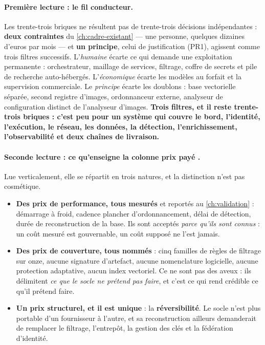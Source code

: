 \paragraph{Première lecture : le fil conducteur.} Les trente-trois briques ne résultent pas de
trente-trois décisions indépendantes : \textbf{deux contraintes} du \cref{ch:cadre-existant} ---
une personne, quelques dizaines d'euros par mois --- et \textbf{un principe}, celui de
justification (PR1), agissent comme trois filtres successifs. L'\emph{humaine} écarte ce qui
demande une exploitation permanente : orchestrateur, maillage de services, filtrage, coffre de
secrets et pile de recherche auto-hébergés. L'\emph{économique} écarte les modèles au forfait et
la supervision commerciale. Le \emph{principe} écarte les doublons : base vectorielle séparée,
second registre d'images, ordonnanceur externe, analyseur de configuration distinct de l'analyseur
d'images. \textbf{Trois filtres, et il reste trente-trois briques : c'est peu pour un système qui
couvre le bord, l'identité, l'exécution, le réseau, les données, la détection, l'enrichissement,
l'observabilité et deux chaînes de livraison.}

\paragraph{Seconde lecture : ce qu'enseigne la colonne \og prix payé \fg{}.} Lue verticalement,
elle se répartit en trois natures, et la distinction n'est pas cosmétique.

\begin{itemize}\setlength{\itemsep}{0pt}\setlength{\parskip}{0pt}
  \item \textbf{Des prix de performance, tous mesurés} et reportés au \cref{ch:validation} :
  démarrage à froid, cadence plancher d'ordonnancement, délai de détection, durée de
  reconstruction de la base. Ils sont acceptés \emph{parce qu'ils sont connus} : un coût mesuré
  est gouvernable, un coût supposé ne l'est jamais.
  \item \textbf{Des prix de couverture, tous nommés} : cinq familles de règles de filtrage sur
  onze, aucune signature d'artefact, aucune nomenclature logicielle, aucune protection adaptative,
  aucun index vectoriel. Ce ne sont pas des aveux : ils délimitent \emph{ce que le socle ne
  prétend pas faire}, et c'est ce qui rend crédible ce qu'il prétend faire.
  \item \textbf{Un prix structurel, et il est unique} : la \textbf{réversibilité}. Le socle n'est
  plus portable d'un fournisseur à l'autre, et sa reconstruction ailleurs demanderait de remplacer
  le filtrage, l'entrepôt, la gestion des clés et la fédération d'identité.
\end{itemize}

